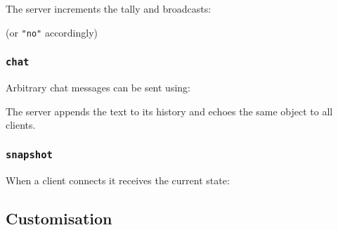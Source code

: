 The server increments the tally and broadcasts:

\begin{Shaded}
\begin{Highlighting}[]
\FunctionTok{\{} \FunctionTok{:} \FunctionTok{,} \FunctionTok{:} \FunctionTok{\{} \FunctionTok{:}  \FunctionTok{\}} \FunctionTok{\}}
\end{Highlighting}
\end{Shaded}

(or \texttt{"no"} accordingly)

\subsubsection{\texorpdfstring{\texttt{chat}}{chat}}\label{chat}

Arbitrary chat messages can be sent using:

\begin{Shaded}
\begin{Highlighting}[]
\FunctionTok{\{} \FunctionTok{:} \FunctionTok{,} \FunctionTok{:}  \FunctionTok{\}}
\end{Highlighting}
\end{Shaded}

The server appends the text to its history and echoes the same object to
all clients.

\subsubsection{\texorpdfstring{\texttt{snapshot}}{snapshot}}\label{snapshot}

When a client connects it receives the current state:

\begin{Shaded}
\begin{Highlighting}[]
\FunctionTok{\{} \FunctionTok{:} \FunctionTok{,} \FunctionTok{:} \FunctionTok{\{} \FunctionTok{:} \FunctionTok{,} \FunctionTok{:}  \FunctionTok{\},} \FunctionTok{:} \OtherTok{[]} \FunctionTok{\}}
\end{Highlighting}
\end{Shaded}

\subsection{Customisation}\label{customisation}

